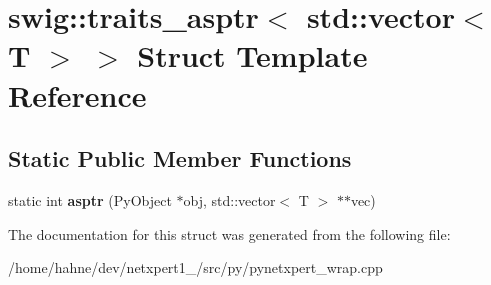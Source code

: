 \hypertarget{structswig_1_1traits__asptr_3_01std_1_1vector_3_01T_01_4_01_4}{}\section{swig\+:\+:traits\+\_\+asptr$<$ std\+:\+:vector$<$ T $>$ $>$ Struct Template Reference}
\label{structswig_1_1traits__asptr_3_01std_1_1vector_3_01T_01_4_01_4}
\subsection*{Static Public Member Functions}
\begin{DoxyCompactItemize}
\item 
static int {\bfseries asptr} (Py\+Object $\ast$obj, std\+::vector$<$ T $>$ $\ast$$\ast$vec)\hypertarget{structswig_1_1traits__asptr_3_01std_1_1vector_3_01T_01_4_01_4_abffecd25e704a44cd75d02ccde1efbe4}{}\label{structswig_1_1traits__asptr_3_01std_1_1vector_3_01T_01_4_01_4_abffecd25e704a44cd75d02ccde1efbe4}

\end{DoxyCompactItemize}


The documentation for this struct was generated from the following file\+:\begin{DoxyCompactItemize}
\item 
/home/hahne/dev/netxpert1\+\_/src/py/pynetxpert\+\_\+wrap.\+cpp\end{DoxyCompactItemize}
